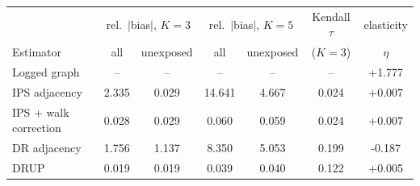 \begin{tabular}{lcccccc}
\toprule
 & \multicolumn{2}{c}{rel.\ $|$bias$|$, $K=3$} & \multicolumn{2}{c}{rel.\ $|$bias$|$, $K=5$} & Kendall $\tau$ & elasticity\\
Estimator & all & unexposed & all & unexposed & ($K=3$) & $\eta$\\
\midrule
Logged graph & -- & -- & -- & -- & -- & +1.777\\
IPS adjacency & 2.335 & 0.029 & 14.641 & 4.667 & 0.024 & +0.007\\
IPS + walk correction & 0.028 & 0.029 & 0.060 & 0.059 & 0.024 & +0.007\\
DR adjacency & 1.756 & 1.137 & 8.350 & 5.053 & 0.199 & -0.187\\
DRUP & 0.019 & 0.019 & 0.039 & 0.040 & 0.122 & +0.005\\
\bottomrule
\end{tabular}
